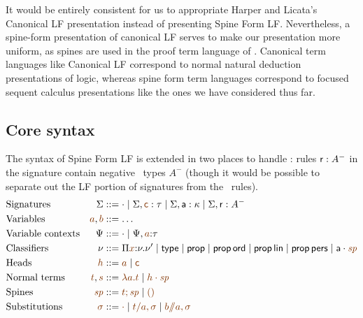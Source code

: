 It would be entirely consistent for us to appropriate Harper and
Licata's Canonical LF presentation instead of presenting Spine Form
LF. Nevertheless, a spine-form presentation of canonical LF serves to
make our presentation more uniform, as spines are used in the proof
term language of \sls. Canonical term languages like Canonical LF
correspond to normal natural deduction presentations of logic, whereas
spine form term languages correspond to focused sequent calculus
presentations like the ones we have considered thus far.

\subsection{Core syntax}

The syntax of Spine Form LF is extended in two places to handle \sls:
rules ${\sf r} : A^-$ in the signature contain negative \sls~types
$A^-$ (though it would be possible to separate out the LF portion of
signatures from the \sls~rules). %
\begin{align*}
& \mbox{Signatures} & \Sigma & ::= \cdot 
  \mid \Sigma, \lf{\sf c} : \tau
  \mid \Sigma, {\sf a} : \kappa
  \mid \Sigma, {\sf r} : A^-
\\
& \mbox{Variables} & \lf{a}, \lf{b} & ::= \ldots
\\
& \mbox{Variable contexts} & \Psi & ::= \cdot
  \mid \Psi, \lf{a} {:} \tau 
\\
& \mbox{Classifiers} & \nu & ::= \lfpi{x}{\nu}{\nu'} \mid {\sf type}
  \mid {\sf prop}
  \mid {\sf prop}\,{\sf ord}
  \mid {\sf prop}\,{\sf lin}
  \mid {\sf prop}\,{\sf pers}
  \mid \lfroot{\sf a}{\spi}
\\
& \mbox{Heads} & \lf{h} & ::= \lf{a} \mid \lf{\sf c}
\\
& \mbox{Normal terms} & \lf{t}, \lf{s} & ::= \lf{\lambda a.t}
  \mid \lf{\lfroot{h}{\spi}}
\\
& \mbox{Spines} & \lf{\spi} & ::= \lf{t; \spi} \mid \lf{\lfnil}
\\
& \mbox{Substitutions} & \lf{\sigma} & ::= \lf{\cdot}
  \mid \lf{t/a, \sigma}
  \mid \lf{b/\!\!/a, \sigma}
\end{align*}

